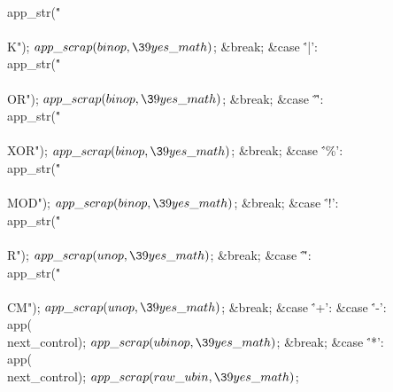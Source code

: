 \\{app\_str}(\.{"\\\\K"});\5
${}\\{app\_scrap}(\\{binop},\39\\{yes\_math}){}$;\5
\&{break};\6
\4\&{case} \.{'|'}:\5
\\{app\_str}(\.{"\\\\OR"});\5
${}\\{app\_scrap}(\\{binop},\39\\{yes\_math}){}$;\5
\&{break};\6
\4\&{case} \.{'\^'}:\5
\\{app\_str}(\.{"\\\\XOR"});\5
${}\\{app\_scrap}(\\{binop},\39\\{yes\_math}){}$;\5
\&{break};\6
\4\&{case} \.{'\%'}:\5
\\{app\_str}(\.{"\\\\MOD"});\5
${}\\{app\_scrap}(\\{binop},\39\\{yes\_math}){}$;\5
\&{break};\6
\4\&{case} \.{'!'}:\5
\\{app\_str}(\.{"\\\\R"});\5
${}\\{app\_scrap}(\\{unop},\39\\{yes\_math}){}$;\5
\&{break};\6
\4\&{case} \.{'\~'}:\5
\\{app\_str}(\.{"\\\\CM"});\5
${}\\{app\_scrap}(\\{unop},\39\\{yes\_math}){}$;\5
\&{break};\6
\4\&{case} \.{'+'}:\5
\&{case} \.{'-'}:\5
\\{app}(\\{next\_control});\5
${}\\{app\_scrap}(\\{ubinop},\39\\{yes\_math}){}$;\5
\&{break};\6
\4\&{case} \.{'*'}:\5
\\{app}(\\{next\_control});\5
${}\\{app\_scrap}(\\{raw\_ubin},\39\\{yes\_math}){}$;\5
